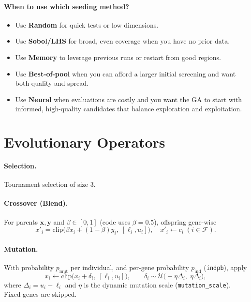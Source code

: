 \documentclass[12pt,a4paper]{article}
\begin{document}
\paragraph{When to use which seeding method?}
\begin{itemize}
\item Use \textbf{Random} for quick tests or low dimensions.
\item Use \textbf{Sobol/LHS} for broad, even coverage when you have no prior data.
\item Use \textbf{Memory} to leverage previous runs or restart from good regions.
\item Use \textbf{Best-of-pool} when you can afford a larger initial screening and want both quality and spread.
\item Use \textbf{Neural} when evaluations are costly and you want the GA to start with informed, high-quality candidates that balance exploration and exploitation.
\end{itemize}

\section{Evolutionary Operators}
\paragraph{Selection.} Tournament selection of size $3$.

\paragraph{Crossover (Blend).} For parents $\bm{x},\bm{y}$ and $\beta\in[0,1]$ (code uses $\beta=0.5$), offspring gene-wise
\[ x'_i = \mathrm{clip}\big(\beta x_i + (1-\beta) y_i,\; [\ell_i,u_i]\big), \quad x'_i \leftarrow c_i\; (i\in\mathcal{F}). \]

\paragraph{Mutation.} With probability $p_{\text{mut}}$ per individual, and per-gene probability $p_{\text{ind}}$ (\texttt{indpb}), apply
\[ x_i \leftarrow \mathrm{clip}\big(x_i + \delta_i,\;[\ell_i,u_i]\big), \qquad \delta_i \sim \mathcal{U}\big(-\eta\Delta_i,\;\eta\Delta_i\big), \]
where $\Delta_i=u_i-\ell_i$ and $\eta$ is the dynamic mutation scale (\texttt{mutation\_scale}). Fixed genes are skipped.
\end{document}
